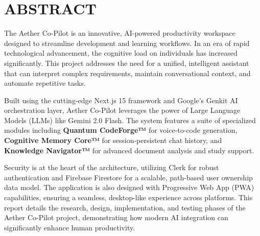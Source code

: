 \chapter*{ABSTRACT}

The Aether Co-Pilot is an innovative, AI-powered productivity workspace designed to streamline development and learning workflows. In an era of rapid technological advancement, the cognitive load on individuals has increased significantly. This project addresses the need for a unified, intelligent assistant that can interpret complex requirements, maintain conversational context, and automate repetitive tasks.

Built using the cutting-edge Next.js 15 framework and Google's Genkit AI orchestration layer, Aether Co-Pilot leverages the power of Large Language Models (LLMs) like Gemini 2.0 Flash. The system features a suite of specialized modules including \textbf{Quantum CodeForge™} for voice-to-code generation, \textbf{Cognitive Memory Core™} for session-persistent chat history, and \textbf{Knowledge Navigator™} for advanced document analysis and study support.

Security is at the heart of the architecture, utilizing Clerk for robust authentication and Firebase Firestore for a scalable, path-based user ownership data model. The application is also designed with Progressive Web App (PWA) capabilities, ensuring a seamless, desktop-like experience across platforms. This report details the research, design, implementation, and testing phases of the Aether Co-Pilot project, demonstrating how modern AI integration can significantly enhance human productivity.
